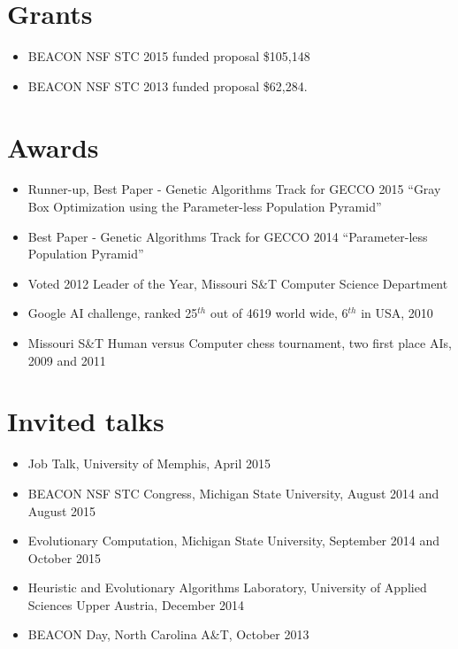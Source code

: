 \documentclass[a4paper,11pt]{article}
\begin{document}
\begin{publications}
\end{publications}

\section{Grants}
\begin{itemize}
\item BEACON NSF STC 2015 funded proposal \$105,148
\item BEACON NSF STC 2013 funded proposal \$62,284.
\end{itemize}

\section{Awards}
\begin{itemize}
\item     Runner-up, Best Paper - Genetic Algorithms Track for GECCO 2015 ``Gray Box Optimization using the Parameter-less Population Pyramid''
\item     Best Paper - Genetic Algorithms Track for GECCO 2014 ``Parameter-less Population Pyramid''
\item     Voted 2012 Leader of the Year, Missouri S\&T Computer Science Department
\item     Google AI challenge, ranked 25$^{th}$ out of 4619 world wide, 6$^{th}$ in USA, 2010
\item     Missouri S\&T Human versus Computer chess tournament, two first place AIs, 2009 and 2011
\end{itemize}

\section{Invited talks}
\begin{itemize}
\item Job Talk, University of Memphis, April 2015
\item BEACON NSF STC Congress, Michigan State University, August 2014 and August 2015
\item Evolutionary Computation, Michigan State University, September 2014 and October 2015
\item Heuristic and Evolutionary Algorithms Laboratory, University of Applied Sciences Upper Austria, December 2014
\item BEACON Day, North Carolina A\&T, October 2013
\end{itemize}
\end{document}
